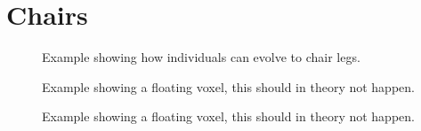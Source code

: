 \section{Chairs}
\begin{figure}[h]
\centering
{}
\hfil
{}
\caption{Example showing how individuals can evolve to chair legs.}
\label{fig:chair:legs}
\end{figure}

\begin{figure}[h]
\centering
{}
\caption{Example showing a floating voxel, this should in theory not happen.}
\label{fig:chair:floatvox}
\end{figure}

\begin{figure}[h]
\centering
{}
\caption{Example showing a floating voxel, this should in theory not happen.}
\label{fig:chair:floatvox}
\end{figure}
